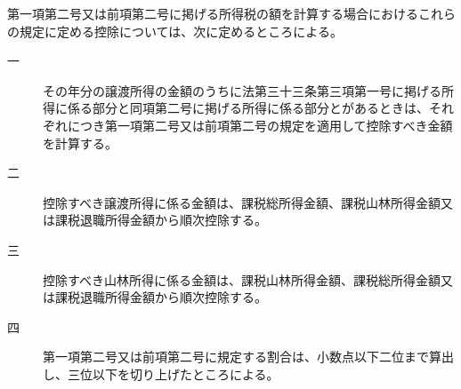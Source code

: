 \documentclass[twocolumn,a4j,10pt]{ltjtarticle}
\begin{document}
\begin{description}
\begin{description}
\begin{description}
\end{description}
\end{description}
\item[\rensuji{3}]第一項第二号又は前項第二号に掲げる所得税の額を計算する場合におけるこれらの規定に定める控除については、次に定めるところによる。
\begin{description}
\item[一]その年分の譲渡所得の金額のうちに法第三十三条第三項第一号に掲げる所得に係る部分と同項第二号に掲げる所得に係る部分とがあるときは、それぞれにつき第一項第二号又は前項第二号の規定を適用して控除すべき金額を計算する。
\item[二]控除すべき譲渡所得に係る金額は、課税総所得金額、課税山林所得金額又は課税退職所得金額から順次控除する。
\item[三]控除すべき山林所得に係る金額は、課税山林所得金額、課税総所得金額又は課税退職所得金額から順次控除する。
\item[四]第一項第二号又は前項第二号に規定する割合は、小数点以下二位まで算出し、三位以下を切り上げたところによる。
\end{description}
\end{description}
\end{document}
